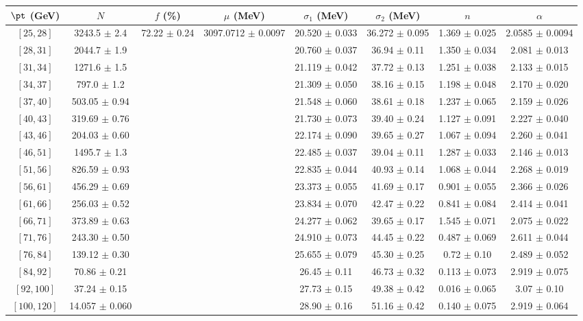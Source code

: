 \begin{tabular}{c||c|c|c|c|c|c|c}
$\pt$ (GeV) & $N$ & $f$ (\%) & $\mu$ (MeV) & $\sigma_1$ (MeV) & $\sigma_2$ (MeV) & $n$ & $\alpha$ \\
\hline
$[25, 28]$ & 3243.5 $\pm$ 2.4 & \multirow{17}{*}{72.22 $\pm$ 0.24} & \multirow{17}{*}{3097.0712 $\pm$ 0.0097} & 20.520 $\pm$ 0.033 & 36.272 $\pm$ 0.095 & 1.369 $\pm$ 0.025 & 2.0585 $\pm$ 0.0094\\
$[28, 31]$ & 2044.7 $\pm$ 1.9 &  &  & 20.760 $\pm$ 0.037 & 36.94 $\pm$ 0.11 & 1.350 $\pm$ 0.034 & 2.081 $\pm$ 0.013\\
$[31, 34]$ & 1271.6 $\pm$ 1.5 &  &  & 21.119 $\pm$ 0.042 & 37.72 $\pm$ 0.13 & 1.251 $\pm$ 0.038 & 2.133 $\pm$ 0.015\\
$[34, 37]$ & 797.0 $\pm$ 1.2 &  &  & 21.309 $\pm$ 0.050 & 38.16 $\pm$ 0.15 & 1.198 $\pm$ 0.048 & 2.170 $\pm$ 0.020\\
$[37, 40]$ & 503.05 $\pm$ 0.94 &  &  & 21.548 $\pm$ 0.060 & 38.61 $\pm$ 0.18 & 1.237 $\pm$ 0.065 & 2.159 $\pm$ 0.026\\
$[40, 43]$ & 319.69 $\pm$ 0.76 &  &  & 21.730 $\pm$ 0.073 & 39.40 $\pm$ 0.24 & 1.127 $\pm$ 0.091 & 2.227 $\pm$ 0.040\\
$[43, 46]$ & 204.03 $\pm$ 0.60 &  &  & 22.174 $\pm$ 0.090 & 39.65 $\pm$ 0.27 & 1.067 $\pm$ 0.094 & 2.260 $\pm$ 0.041\\
$[46, 51]$ & 1495.7 $\pm$ 1.3 &  &  & 22.485 $\pm$ 0.037 & 39.04 $\pm$ 0.11 & 1.287 $\pm$ 0.033 & 2.146 $\pm$ 0.013\\
$[51, 56]$ & 826.59 $\pm$ 0.93 &  &  & 22.835 $\pm$ 0.044 & 40.93 $\pm$ 0.14 & 1.068 $\pm$ 0.044 & 2.268 $\pm$ 0.019\\
$[56, 61]$ & 456.29 $\pm$ 0.69 &  &  & 23.373 $\pm$ 0.055 & 41.69 $\pm$ 0.17 & 0.901 $\pm$ 0.055 & 2.366 $\pm$ 0.026\\
$[61, 66]$ & 256.03 $\pm$ 0.52 &  &  & 23.834 $\pm$ 0.070 & 42.47 $\pm$ 0.22 & 0.841 $\pm$ 0.084 & 2.414 $\pm$ 0.041\\
$[66, 71]$ & 373.89 $\pm$ 0.63 &  &  & 24.277 $\pm$ 0.062 & 39.65 $\pm$ 0.17 & 1.545 $\pm$ 0.071 & 2.075 $\pm$ 0.022\\
$[71, 76]$ & 243.30 $\pm$ 0.50 &  &  & 24.910 $\pm$ 0.073 & 44.45 $\pm$ 0.22 & 0.487 $\pm$ 0.069 & 2.611 $\pm$ 0.044\\
$[76, 84]$ & 139.12 $\pm$ 0.30 &  &  & 25.655 $\pm$ 0.079 & 45.30 $\pm$ 0.25 & 0.72 $\pm$ 0.10 & 2.489 $\pm$ 0.052\\
$[84, 92]$ & 70.86 $\pm$ 0.21 &  &  & 26.45 $\pm$ 0.11 & 46.73 $\pm$ 0.32 & 0.113 $\pm$ 0.073 & 2.919 $\pm$ 0.075\\
$[92, 100]$ & 37.24 $\pm$ 0.15 &  &  & 27.73 $\pm$ 0.15 & 49.38 $\pm$ 0.42 & 0.016 $\pm$ 0.065 & 3.07 $\pm$ 0.10\\
$[100, 120]$ & 14.057 $\pm$ 0.060 &  &  & 28.90 $\pm$ 0.16 & 51.16 $\pm$ 0.42 & 0.140 $\pm$ 0.075 & 2.919 $\pm$ 0.064\\
\end{tabular}
